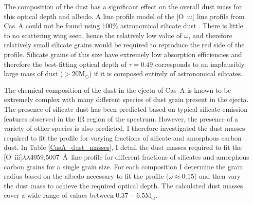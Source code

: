 The composition of the dust has a significant effect on the overall dust mass for this optical depth and albedo.  A line profile model of the [O~{\sc iii}] line profile from Cas~A could not be found using 100\% astronomical silicate dust \citep{Draine1984}.  There is little to no scattering wing seen, hence the relatively low value of $\omega$, and therefore relatively small silicate grains would be required to reproduce the red side of the profile.  Silicate grains of this size have extremely low absorption efficiencies and therefore the best-fitting optical depth of $\tau=0.49$ corresponds to an implausibly large mass of dust ($>20$M$_{\odot}$) if it is composed entirely of astronomical silicates.



The chemical composition of the dust in the ejecta of Cas~A is known to be extremely complex \citep{Arendt2014} with many different species of dust grain present in the ejecta.  The presence of silicate dust has been predicted based on typical silicate emission features observed in the IR region of the spectrum.  However, the presence of a variety of other species is also predicted.  I therefore investigated the dust masses required to fit the profile for varying fractions of silicate and amorphous carbon dust.  In Table \ref{CasA_dust_masses}, I detail the dust masses required to fit the [O~{\sc iii}]$\lambda\lambda$4959,5007~\AA\  line profile for different fractions of silicates and amorphous carbon grains for a single grain size.  For each composition I determine the grain radius based on the albedo necessary to fit the profile ($\omega\approx0.15$) and then vary the dust mass to achieve the required optical depth.  The calculated dust masses cover a wide range of values between $0.37 - 6.5$M$_{\odot}$.   

